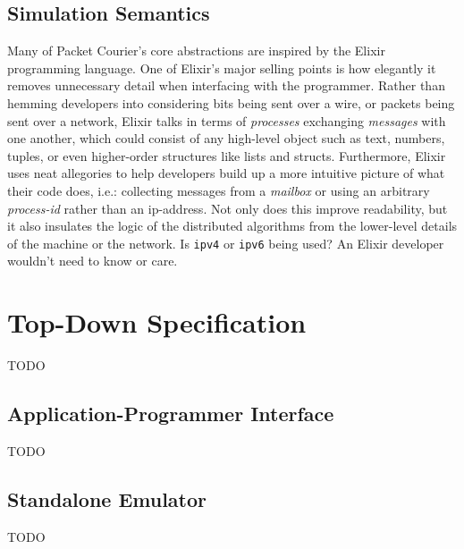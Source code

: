 \subsection{Simulation Semantics}

Many of Packet Courier's core abstractions are inspired by the Elixir programming language\cite{elixir}. One of
Elixir's major selling points is how elegantly it removes unnecessary detail when interfacing with the programmer.
Rather than hemming developers into considering bits being sent over a wire, or packets being sent over a network,
Elixir talks in terms of \emph{processes} exchanging \emph{messages} with one another, which could consist of any
high-level object such as text, numbers, tuples, or even higher-order structures like lists and structs.
Furthermore, Elixir uses neat allegories to help developers build up a more intuitive picture of what their code
does, i.e.: collecting messages from a \emph{mailbox} or using an arbitrary \emph{process-id} rather than an
ip-address. Not only does this improve readability, but it also insulates the logic of the distributed algorithms
from the lower-level details of the machine or the network. Is \texttt{ipv4} or \texttt{ipv6} being used? An Elixir
developer wouldn't need to know or care.


\section{Top-Down Specification}

TODO

\subsection{Application-Programmer Interface}

TODO

\subsection{Standalone Emulator}

TODO
